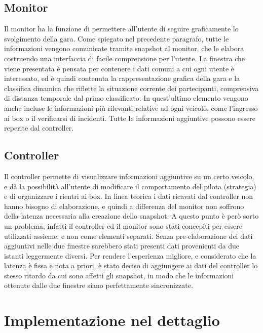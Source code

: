 \subsection{Monitor}

Il monitor ha la funzione di permettere all’utente di seguire graficamente lo svolgimento della gara. Come spiegato nel precedente paragrafo, tutte le informazioni vengono comunicate tramite snapshot al monitor, che le elabora costruendo una interfaccia di facile comprensione per l’utente.
La finestra che viene presentata è pensata per contenere i dati comuni a cui ogni utente è interessato, ed è quindi contenuta la rappresentazione grafica della gara e la classifica dinamica che riflette la situazione corrente dei partecipanti, comprensiva di distanza temporale dal primo classificato. In quest’ultimo elemento vengono anche incluse le informazioni più rilevanti relative ad ogni veicolo, come l’ingresso ai box o il verificarsi di incidenti.
Tutte le informazioni aggiuntive possono essere reperite dal controller.

\subsection{Controller}

Il controller permette di visualizzare informazioni aggiuntive su un certo veicolo, e dà la possibilità all’utente di modificare il comportamento del pilota (strategia) e di organizzare i rientri ai box. 
In linea teorica i dati ricavati dal controller non hanno bisogno di elaborazione, e quindi a differenza del monitor non soffrono della latenza necessaria alla creazione dello snapshot.
A questo punto è però sorto un problema, infatti il controller ed il monitor sono stati concepiti per essere utilizzati assieme, e non come elementi separati.  Senza pre-elaborazione dei dati aggiuntivi  nelle due finestre sarebbero stati presenti dati provenienti da due istanti leggermente diversi. Per rendere l’esperienza migliore, e considerato che la latenza è fissa e nota a priori, è stato deciso di aggiungere ai dati del controller lo stesso ritardo da cui sono affetti gli snapshot, in modo che le informazioni ottenute dalle due finestre siano perfettamente sincronizzate.

\section{Implementazione nel dettaglio}

